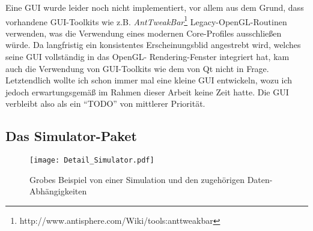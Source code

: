 	Eine GUI wurde leider noch nicht implementiert, vor allem aus dem Grund, dass vorhandene GUI-Toolkits wie z.B.
	\emph{AntTweakBar}\footnote{http://www.antisphere.com/Wiki/tools:anttweakbar} Legacy-OpenGL-Routinen verwenden,
	was die Verwendung eines modernen Core-Profiles ausschließen würde.
	Da langfristig ein konsistentes Erscheinungsblid angestrebt wird, welches seine GUI vollständig in das 
	OpenGL- Rendering-Fenster integriert hat, kam auch die  Verwendung von GUI-Toolkits wie dem von Qt nicht in Frage.\\
	Letztendlich wollte ich schon immer mal eine kleine GUI entwickeln, wozu ich jedoch erwartungsgemäß im Rahmen dieser
	Arbeit keine Zeit hatte. Die GUI verbleibt also als ein "`TODO"' von mittlerer Priorität.




\subsection{Das Simulator-Paket}

	\begin{figure}[!h]
		 \texttt{[image: Detail\_Simulator.pdf]}
		\caption{Grobes Beispiel von einer Simulation und den zugehörigen Daten-Abhängigkeiten}
		\label{fig:detailSimulator}
	\end{figure}



